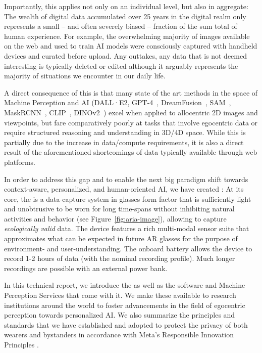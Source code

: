 Importantly, this applies not only on an individual level, but also in aggregate: The wealth of digital data accumulated over 25 years in the digital realm only represents a small -- and often severely biased -- fraction of the sum total of human experience. For example, the overwhelming majority of images available on the web and used to train AI models were consciously captured with handheld devices and curated before upload. Any outtakes, any data that is not deemed interesting is typically deleted or edited although it arguably represents the majority of situations we encounter in our daily life.

A direct consequence of this is that many state of the art methods in the space of Machine Perception and AI (DALL·E2\cite{ramesh2022hierarchical}, GPT-4~\cite{openai2023gpt4}, DreamFusion~\cite{poole2022dreamfusion}, SAM~\cite{kirillov2023segment}, MaskRCNN~\cite{he2017mask}, CLIP~\cite{radford2021learning}, DINOv2~\cite{oquab2023dinov2}) excel when applied to allocentric 2D images and viewpoints, but fare comparatively poorly at tasks that involve egocentric data or require structured reasoning and understanding in 3D/4D space. While  this is partially due to the increase in data/compute requirements, it is also a direct result of the aforementioned shortcomings of data typically  
available through web platforms.

In order to address this gap and to enable the next big paradigm shift towards context-aware, personalized, and human-oriented AI, we have created \textit{\ProjectAria}: At its core, the \AriaDevice{} is a data-capture system in glasses form factor that is sufficiently light and unobtrusive to be worn for long time-spans without inhibiting natural activities and behavior (see Figure~\ref{fig:aria-image}), allowing to capture \textit{ecologically valid} data. The device features a rich multi-modal sensor suite that approximates what can be expected in future AR glasses for the purpose of environment- and user-understanding. The onboard battery allows the device to record 1-2 hours of data (with the nominal recording profile). Much longer recordings are possible with an external power bank.

In this technical report, we introduce the \AriaDevice{} as well as the software and Machine Perception Services that come with it. We make these available to research institutions around the world to foster advancements in the field of egocentric perception towards personalized AI. 
We also summarize the principles and standards that we have established and adopted to protect the privacy of both wearers and bystanders in accordance with Meta's Responsible Innovation Principles \cite{metari}.

